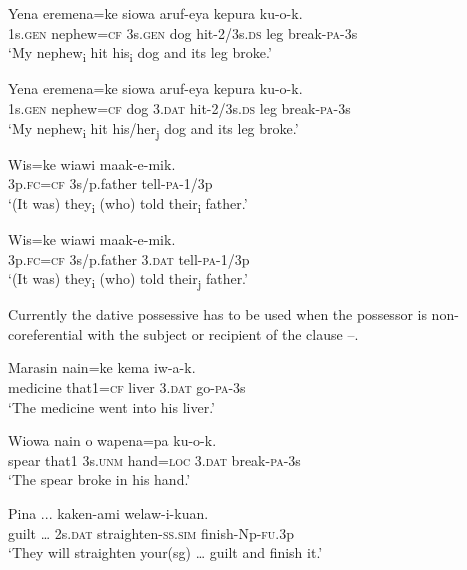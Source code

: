 \ea%
\label{ex:3:x1797}
\gll Yena eremena=ke   siowa aruf-eya kepura ku-o-k. \\
1s.\textsc{gen} nephew=\textsc{cf} 3s.\textsc{gen} dog hit-2/3s.\textsc{ds} leg break-\textsc{pa}-3s\\
\glt`My nephew\textsubscript{i} hit his\textsubscript{i} dog and its leg broke.'
\z

\ea%
\label{ex:3:x1796}
\gll Yena eremena=ke siowa  aruf-eya kepura ku-o-k. \\
1s.\textsc{gen} nephew=\textsc{cf} dog 3.\textsc{dat} hit-2/3s.\textsc{ds} leg break-\textsc{pa}-3s\\
\glt`My nephew\textsubscript{i} hit his/her\textsubscript{j} dog and its leg broke.'
\z

\ea%
\label{ex:3:x1798}
\gll Wis=ke wiawi maak-e-mik. \\
3p.\textsc{fc}=\textsc{cf} 3s/p.father tell-\textsc{pa}-1/3p\\
\glt`(It was) they\textsubscript{i} (who) told their\textsubscript{i} father.'
\z

\ea%
\label{ex:3:x1799}
\gll Wis=ke wiawi  maak-e-mik. \\
3p.\textsc{fc}=\textsc{cf} 3s/p.father 3.\textsc{dat} tell-\textsc{pa}-1/3p\\
\glt`(It was) they\textsubscript{i} (who) told their\textsubscript{j} father.'
\z

Currently the dative possessive has to be used when the possessor is non-coreferential with the subject or recipient of the clause --.

\ea%
\label{ex:3:x588}
\gll Marasin nain=ke kema  iw-a-k. \\
medicine that1=\textsc{cf} liver 3.\textsc{dat} go-\textsc{pa}-3s\\
\glt`The medicine went into his liver.'
\z

\ea%
\label{ex:3:x853}
\gll Wiowa nain o wapena=pa   ku-o-k. \\
spear that1 3s.\textsc{unm} hand=\textsc{loc} 3.\textsc{dat} break-\textsc{pa}-3s\\
\glt`The spear broke in his hand.'
\z

\ea%
\label{ex:3:x1794}
\gll Pina ...  kaken-ami welaw-i-kuan. \\
guilt {\dots} 2s.\textsc{dat} straighten-\textsc{ss}.\textsc{sim} finish-Np-\textsc{fu}.3p\\
\glt`They will straighten your(sg) {\dots} guilt and finish it.'
\z

